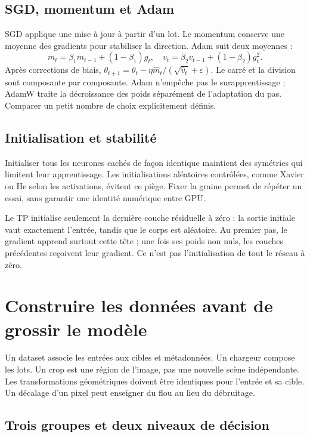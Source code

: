 \documentclass[12pt,a4paper,oneside]{report}
\begin{document}
\section{SGD, momentum et Adam}

SGD applique une mise à jour à partir d'un lot. Le momentum conserve une moyenne
des gradients pour stabiliser la direction. Adam suit deux moyennes :
\[
 m_t=\beta_1m_{t-1}+(1-\beta_1)g_t,\quad
 v_t=\beta_2v_{t-1}+(1-\beta_2)g_t^2.
\]
Après corrections de biais,
$\theta_{t+1}=\theta_t-\eta\hat m_t/(\sqrt{\hat v_t}+\varepsilon)$.
Le carré et la division sont composante par composante. Adam n'empêche pas
le surapprentissage ; AdamW traite la décroissance des poids séparément de
l'adaptation du pas. Comparer un petit nombre de choix explicitement définis.

\section{Initialisation et stabilité}

Initialiser tous les neurones cachés de façon identique maintient des symétries
qui limitent leur apprentissage. Les initialisations aléatoires contrôlées,
comme Xavier ou He selon les activations, évitent ce piège. Fixer la graine
permet de répéter un essai, sans garantir une identité numérique entre GPU.

Le TP initialise seulement la dernière couche résiduelle à zéro : la sortie
initiale vaut exactement l'entrée, tandis que le corps est aléatoire. Au premier
pas, le gradient apprend surtout cette tête ; une fois ses poids non nuls, les
couches précédentes reçoivent leur gradient. Ce n'est pas l'initialisation de
tout le réseau à zéro.

\chapter{Construire les données avant de grossir le modèle}

Un dataset associe les entrées aux cibles et métadonnées. Un chargeur compose
les lots. Un crop est une région de l'image, pas une nouvelle scène indépendante.
Les transformations géométriques doivent être identiques pour l'entrée et sa
cible. Un décalage d'un pixel peut enseigner du flou au lieu du débruitage.

\section{Trois groupes et deux niveaux de décision}
\end{document}
